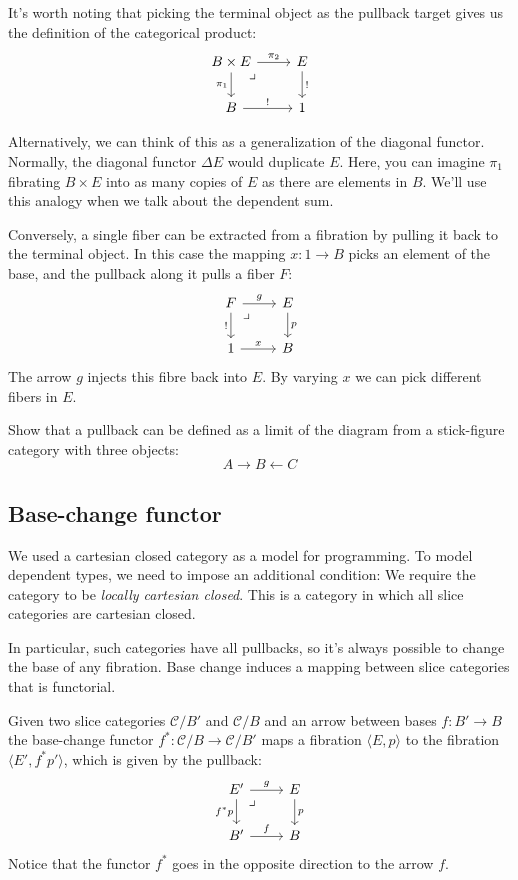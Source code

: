 \documentclass[DaoFP]{subfiles}
\begin{document}
It's worth noting that picking the terminal object as the pullback target gives us the definition of the categorical product:
\[
 \begin{tikzcd}
 B \times E
 \arrow[d, "\pi_1"']
 \arrow[r, "\pi_2"]
\arrow[dr, phantom,  , very near start, "\lrcorner"]
 & E
 \arrow[d, "!"]
 \\
 B
 \arrow[r, "!"]
 &
 1
  \end{tikzcd}
\]

Alternatively, we can think of this as a generalization of the diagonal functor. Normally, the diagonal functor $\Delta E$ would duplicate $E$. Here, you can imagine $\pi_1$ fibrating $B\times E$ into as many copies of $E$ as there are elements in $B$. We'll use this analogy when we talk about the dependent sum.

Conversely, a single fiber can be extracted from a fibration by pulling it back to the terminal object. In this case the mapping $x \colon 1 \to B$ picks an element of the base, and the pullback along it pulls a fiber $F$:
\[
 \begin{tikzcd}
 F
 \arrow[d, "!"']
 \arrow[r, "g"]
\arrow[dr, phantom,  , very near start, "\lrcorner"]
 & E
 \arrow[d, "p"]
 \\
 1
 \arrow[r, "x"]
 &
 B
  \end{tikzcd}
\]
The arrow $g$ injects this fibre back into $E$. By varying $x$ we can pick different fibers in $E$.

\begin{exercise}
Show that a pullback can be defined as a limit of the diagram from a stick-figure category with three objects:
\[ A \rightarrow B \leftarrow C \]
\end{exercise}

\subsection{Base-change functor}

We used a cartesian closed category as a model for programming. To model dependent types, we need to impose an additional condition: We require the category to be \emph{locally cartesian closed}. This is a category in which all slice categories are cartesian closed. 

In particular, such categories have all pullbacks, so it's always possible to change the base of any fibration.  Base change induces a mapping between slice categories that is functorial. 

Given two slice categories $\mathcal{C}/B'$ and $\mathcal{C}/B$ and an arrow between bases $f \colon B' \to B$ the base-change functor $f^* \colon \mathcal{C}/B \to \mathcal{C}/B'$ maps a fibration $\langle E, p \rangle$ to the fibration $\langle E', f^* p' \rangle$, which is given by the pullback:
\[
 \begin{tikzcd}
 E'
\arrow[dr, phantom,  , very near start, "\lrcorner"]
 \arrow[d, "f^*p"']
 \arrow[r, "g"]
 & E
 \arrow[d, "p"]
 \\
 B'
 \arrow[r, "f"]
 &B
  \end{tikzcd}
\]
Notice that the functor $f^*$ goes in the opposite direction to the arrow $f$.
\end{document}
